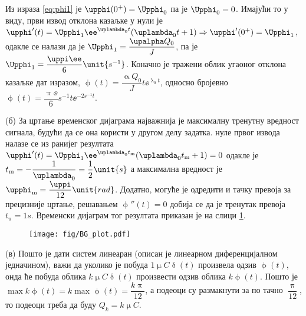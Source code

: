 Из израза \eqref{eq:phi1} је $\upphi(0^+) = \Upphi_0$ па је 
$\Upphi_0 = 0$. Имајући то у виду, први извод отклона казаљке у нули је 
$\upphi'(t) = \Upphi_1 \ee^{\uplambda_0 t}( \uplambda_0 t + 1 ) \Rightarrow 
\upphi'(0^+) = \Upphi_1
$, одакле се налази да је  
$\Upphi_1 = \dfrac{\upalpha Q_0}{J}$, па је 
$\Upphi_1 =  \dfrac{\uppi \ee}{6} \unit{s^{-1}}$. Коначно је тражени облик угаоног отклона казаљке 
дат изразом, $\upphi(t) = \dfrac{\upalpha Q_0}{J} t \ee^{\uplambda_0 t}$, односно бројевно 
$\upphi(t) = \dfrac{\uppi\ee}{6}\unit{s^{-1}} t 
\ee^{-2\unit{s^{-1}} t}$.  


(б) За цртање временског дијаграма најважнија је максималну тренутну вредност сигнала, будући
да се она користи у другом делу задатка. 
нуле првог извода налазе се из ранијег резултата 
$\upphi'(t) = \Upphi_1 \ee^{\uplambda_0 t_{\rm m}} (\uplambda_0 t_{\rm m} + 1) = 0$ 
одакле је $t_{\rm m} = -\dfrac{1}{\uplambda_0} = \dfrac{1}{2}\unit{s}$ а максимална 
вредност је $\upphi_{\rm m} = \dfrac{\uppi}{12}\unit{rad}$. Додатно, могуће је одредити 
и тачку превоја за прецизније цртање, решавањем $\upphi''(t) = 0$ добија се да је тренутак превоја
$t_{\uppi} = 1\unit{s}$. Временски дијаграм тог резултата приказан је на слици 
\ref{fig:\ID.3}.

\begin{figure}[ht!]
    \centering
    \texttt{[image: fig/BG\_plot.pdf]}
    \caption{}
    \label{fig:\ID.3}
\end{figure}

(в) Пошто је дати систем линеаран (описан је линеарном диференцијалном једначином), 
важи да уколико је побуда $1\unit{\upmu C} \updelta(t)$ произвела одзив 
$\upphi(t)$, онда ће побуда облика $k \unit{\upmu C} \updelta(t)$ произвести одзив
облика $k \upphi(t)$. Пошто је $\max k\upphi(t) = k \max \upphi(t) = \dfrac{k\uppi}{12}$,
а подеоци су размакнути за по тачно $\dfrac{\uppi}{12}$, то подеоци треба да буду 
${Q_k = k\unit{\upmu C}}$.

\vfill
